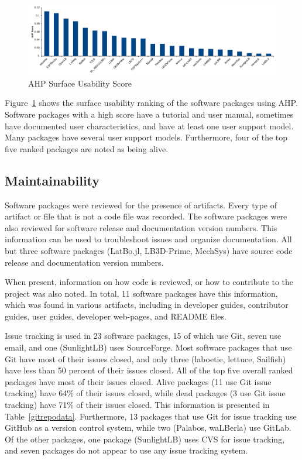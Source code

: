 \documentclass[final, 3p, times, authoryear]{elsarticle}
\begin{document}
\begin{figure}[h!]
	\begin{center}
		\includegraphics[width=1.0\textwidth]{./figures/usability_chart.pdf}
		\caption{AHP Surface Usability Score}
		\label{Fig_Usability}
	\end{center}
\end{figure}

Figure~\ref{Fig_Usability} shows the surface usability ranking of the software
packages using AHP. Software packages with a high score have a tutorial and user
manual, sometimes have documented user characteristics, and have at least one
user support model. Many packages have several user support models. Furthermore,
four of the top five ranked packages are noted as being alive. 

\subsection{Maintainability}

Software packages were reviewed for the presence of artifacts. Every type of
artifact or file that is not a code file was recorded. The software packages
were also reviewed for software release and documentation version numbers. This
information can be used to troubleshoot issues and organize documentation. All
but three software packages (LatBo.jl, LB3D-Prime, MechSys) have source code
release and documentation version numbers.

When present, information on how code is reviewed, or how to contribute to the
project was also noted. In total, 11 software packages have this information,
which was found in various artifacts, including in developer guides, contributor
guides, user guides, developer web-pages, and README files. 

Issue tracking is used in 23 software packages, 15 of which use Git, seven use
email, and one (SunlightLB) uses SourceForge. Most software packages that use
Git have most of their issues closed, and only three (laboetie, lettuce,
Sailfish) have less than 50 percent of their issues closed. All of the top five
overall ranked packages have most of their issues closed. Alive packages (11 use
Git issue tracking) have 64\% of their issues closed, while dead packages (3 use
Git issue tracking) have 71\% of their issues closed. This information is
presented in Table~\ref{gitrepodata}. Furthermore, 13 packages that use Git for
issue tracking use GitHub as a version control system, while two (Palabos,
waLBerla) use GitLab. Of the other packages, one package (SunlightLB) uses CVS
for issue tracking, and seven packages do not appear to use any issue tracking
system.
\end{document}
